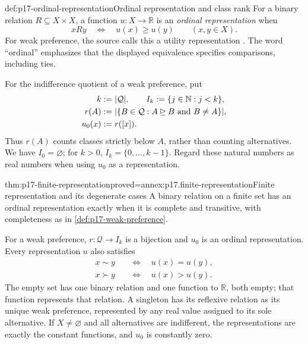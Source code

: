 \begin{hbdefinition}{def:p17-ordinal-representation}{Ordinal representation and class rank}
For a binary relation \(R\subseteq X\times X\), a function
\(u:X\to\mathbb{R}\) is an \emph{ordinal representation} when
\[
 xRy\quad\Longleftrightarrow\quad u(x)\geq u(y)
                         \qquad(x,y\in X).
\]
For weak preference, the source calls this a utility representation
\cite[p.~12]{Rubinstein2015LectureNotes}. The word ``ordinal'' emphasizes
that the displayed equivalence specifies comparisons, including ties.

For the indifference quotient of a weak preference, put
\[
\begin{aligned}
 k&\mathrel{:=}|\mathcal Q|,\qquad I_k\mathrel{:=}\{j\in\mathbb{N}:j<k\},\\
 r(A)&\mathrel{:=}|\{B\in\mathcal Q:A\unrhd B\text{ and }B\ne A\}|,\\
 u_0(x)&\mathrel{:=} r([x]).
\end{aligned}
\]
Thus \(r(A)\) counts classes strictly below \(A\), rather than
counting alternatives. We have \(I_0=\varnothing\); for \(k>0\),
\(I_k=\{0,\ldots,k-1\}\). Regard these natural numbers as real
numbers when using \(u_0\) as a representation.
\end{hbdefinition}

\begin{hbtheorem}{thm:p17-finite-representation}{proved=annex:p17.finite-representation}{Finite representation and its degenerate cases}
A binary relation on a finite set has an ordinal representation exactly
when it is complete and transitive, with completeness as in
\cref{def:p17-weak-preference}.

For a weak preference, \(r:\mathcal Q\to I_k\) is a bijection and
\(u_0\) is an ordinal representation. Every representation \(u\)
also satisfies
\[
\begin{aligned}
 x\sim y&\quad\Longleftrightarrow\quad u(x)=u(y),\\
 x\succ y&\quad\Longleftrightarrow\quad u(x)>u(y).
\end{aligned}
\]
The empty set has one binary relation and one function to \(\mathbb{R}\),
both empty; that function represents that relation. A singleton has its
reflexive relation as its unique weak preference, represented by any real
value assigned to its sole alternative. If \(X\ne\varnothing\)
and all alternatives are indifferent, the representations are exactly the
constant functions, and \(u_0\) is constantly zero.
\end{hbtheorem}

